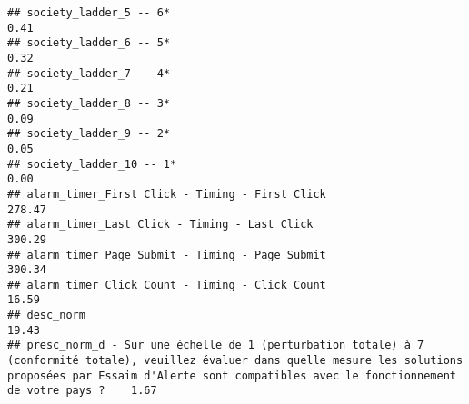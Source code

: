 \documentclass[
]{article}
\begin{document}
\begin{verbatim}
## society_ladder_5 -- 6*                                                                                                                                                                                                        0.41
## society_ladder_6 -- 5*                                                                                                                                                                                                        0.32
## society_ladder_7 -- 4*                                                                                                                                                                                                        0.21
## society_ladder_8 -- 3*                                                                                                                                                                                                        0.09
## society_ladder_9 -- 2*                                                                                                                                                                                                        0.05
## society_ladder_10 -- 1*                                                                                                                                                                                                       0.00
## alarm_timer_First Click - Timing - First Click                                                                                                                                                                              278.47
## alarm_timer_Last Click - Timing - Last Click                                                                                                                                                                                300.29
## alarm_timer_Page Submit - Timing - Page Submit                                                                                                                                                                              300.34
## alarm_timer_Click Count - Timing - Click Count                                                                                                                                                                               16.59
## desc_norm                                                                                                                                                                                                                    19.43
## presc_norm_d - Sur une échelle de 1 (perturbation totale) à 7 (conformité totale), veuillez évaluer dans quelle mesure les solutions proposées par Essaim d'Alerte sont compatibles avec le fonctionnement de votre pays ?    1.67

\end{verbatim}
\end{document}
